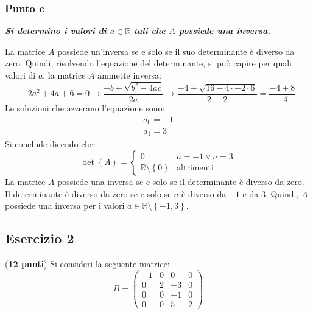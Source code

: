 \documentclass[a4paper]{article}
\begin{document}
	\subsubsection{Punto c}
	
	\textcolor{Green4}{\textbf{\emph{Si determino i valori di $a \in \mathbb{R}$ tali che $A$ possiede una inversa.}}}\newline
	
	\noindent
	La matrice $A$ possiede un'inversa se e solo se il suo determinante è diverso da zero. Quindi, risolvendo l'equazione del determinante, si può capire per quali valori di $a$, la matrice $A$ ammette inversa:
	\begin{equation*}
		-2a^{2} + 4a + 6 = 0\longrightarrow \dfrac{-b \pm \sqrt{b^{2} - 4ac}}{2a} \longrightarrow
		\dfrac{-4 \pm \sqrt{16 - 4 \cdot -2 \cdot 6}}{2 \cdot -2} = \dfrac{-4 \pm 8}{-4}
	\end{equation*}
	Le soluzioni che azzerano l'equazione sono:
	\begin{gather*}
		a_{0} = -1 \\
		a_{1} = 3
	\end{gather*}
	Si conclude dicendo che:
	\begin{equation*}
		\det\left(A\right) = \begin{cases}
			0										& a = -1 \lor a = 3 \\
			\mathbb{R} \setminus \left\{0\right\}	& \text{altrimenti}
		\end{cases}
	\end{equation*}
	La matrice $A$ possiede una inversa se e solo se il determinante è diverso da zero. Il determinante è diverso da zero se e solo se $a$ è diverso da $-1$ e da $3$. Quindi, $A$ possiede una inversa per i valori $a \in \mathbb{R} \setminus \left\{-1, 3\right\}$.\newpage

	\subsection{Esercizio 2}
	
	(\textbf{12 punti}) Si consideri la seguente matrice:
	\begin{equation*}
		B = \begin{pmatrix}
			-1	& 0		& 0		& 0 \\
			0	& 2		& -3	& 0 \\
			0	& 0		& -1	& 0 \\
			0	& 0		& 5		& 2
		\end{pmatrix}
	\end{equation*}
	
\end{document}
